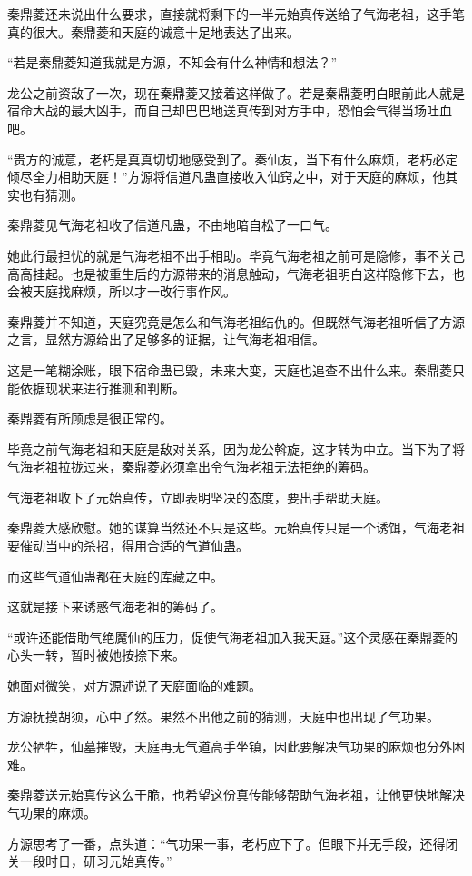 \begin{this_body}
秦鼎菱还未说出什么要求，直接就将剩下的一半元始真传送给了气海老祖，这手笔真的很大。秦鼎菱和天庭的诚意十足地表达了出来。

“若是秦鼎菱知道我就是方源，不知会有什么神情和想法？”

龙公之前资敌了一次，现在秦鼎菱又接着这样做了。若是秦鼎菱明白眼前此人就是宿命大战的最大凶手，而自己却巴巴地送真传到对方手中，恐怕会气得当场吐血吧。

“贵方的诚意，老朽是真真切切地感受到了。秦仙友，当下有什么麻烦，老朽必定倾尽全力相助天庭！”方源将信道凡蛊直接收入仙窍之中，对于天庭的麻烦，他其实也有猜测。

秦鼎菱见气海老祖收了信道凡蛊，不由地暗自松了一口气。

她此行最担忧的就是气海老祖不出手相助。毕竟气海老祖之前可是隐修，事不关己高高挂起。也是被重生后的方源带来的消息触动，气海老祖明白这样隐修下去，也会被天庭找麻烦，所以才一改行事作风。

秦鼎菱并不知道，天庭究竟是怎么和气海老祖结仇的。但既然气海老祖听信了方源之言，显然方源给出了足够多的证据，让气海老祖相信。

这是一笔糊涂账，眼下宿命蛊已毁，未来大变，天庭也追查不出什么来。秦鼎菱只能依据现状来进行推测和判断。

秦鼎菱有所顾虑是很正常的。

毕竟之前气海老祖和天庭是敌对关系，因为龙公斡旋，这才转为中立。当下为了将气海老祖拉拢过来，秦鼎菱必须拿出令气海老祖无法拒绝的筹码。

气海老祖收下了元始真传，立即表明坚决的态度，要出手帮助天庭。

秦鼎菱大感欣慰。她的谋算当然还不只是这些。元始真传只是一个诱饵，气海老祖要催动当中的杀招，得用合适的气道仙蛊。

而这些气道仙蛊都在天庭的库藏之中。

这就是接下来诱惑气海老祖的筹码了。

“或许还能借助气绝魔仙的压力，促使气海老祖加入我天庭。”这个灵感在秦鼎菱的心头一转，暂时被她按捺下来。

她面对微笑，对方源述说了天庭面临的难题。

方源抚摸胡须，心中了然。果然不出他之前的猜测，天庭中也出现了气功果。

龙公牺牲，仙墓摧毁，天庭再无气道高手坐镇，因此要解决气功果的麻烦也分外困难。

秦鼎菱送元始真传这么干脆，也希望这份真传能够帮助气海老祖，让他更快地解决气功果的麻烦。

方源思考了一番，点头道：“气功果一事，老朽应下了。但眼下并无手段，还得闭关一段时日，研习元始真传。”


\end{this_body}
